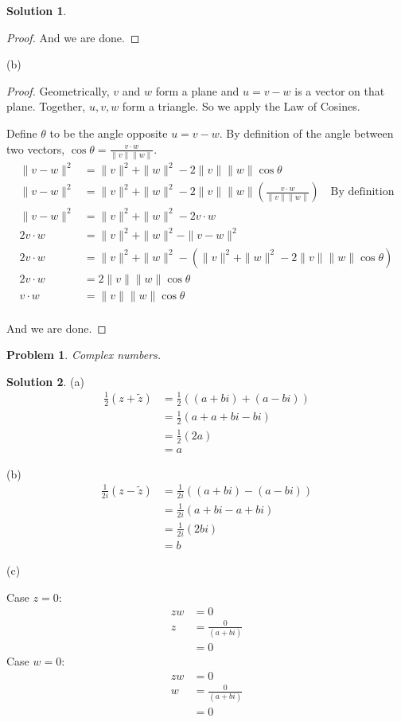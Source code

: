 \documentclass{article}
\newtheorem{problem}{Problem}
\theoremstyle{definition}
\newtheorem*{solution}{Solution}
\begin{document}
\begin{solution}
\begin{proof}
And we are done.
\end{proof}

(b) \begin{proof}
Geometrically, $v$ and $w$ form a plane and $u=v-w$ is a vector on that plane.
Together, $u,v,w$ form a triangle.
So we apply the Law of Cosines.

Define $\theta$ to be the angle opposite $u=v-w$.
By definition of the angle between two vectors, $\cos\theta=\frac{v\cdot w}{\|v\|\|w\|}$.
\begin{align*}
\|v-w\|^2&=\|v\|^2+\|w\|^2-2\|v\|\|w\|\cos\theta \\
\|v-w\|^2&=\|v\|^2+\|w\|^2-2\|v\|\|w\|\left(\frac{v\cdot w}{\|v\|\|w\|}\right) \quad \text{By definition} \\
\|v-w\|^2&=\|v\|^2+\|w\|^2-2v\cdot w \\
2v\cdot w&=\|v\|^2+\|w\|^2-\|v-w\|^2 \\
2v\cdot w&=\|v\|^2+\|w\|^2-(\|v\|^2+\|w\|^2-2\|v\|\|w\|\cos\theta) \\
2v\cdot w&=2\|v\|\|w\|\cos\theta \\
v\cdot w&=\|v\|\|w\|\cos\theta \\
\end{align*}

And we are done.
\end{proof}

\end{solution}

\begin{problem} 

Complex numbers.

\end{problem}

\begin{solution}

(a) \begin{align*}
\frac{1}{2}(z+\tilde{z})&=\frac{1}{2}((a+bi)+(a-bi)) \\
&=\frac{1}{2}(a+a+bi-bi) \\
&=\frac{1}{2}(2a) \\
&=a
\end{align*}

(b) \begin{align*}
\frac{1}{2i}(z-\tilde{z})&=\frac{1}{2i}((a+bi)-(a-bi)) \\
&=\frac{1}{2i}(a+bi-a+bi) \\
&=\frac{1}{2i}(2bi) \\
&=b
\end{align*}

(c) 
\begin{multicols}{2}
Case $z=0$: 
\begin{align*}
zw&=0 \\
z&=\frac{0}{(a+bi)} \\
&=0
\end{align*}
Case $w=0$:
\begin{align*}
zw&=0 \\
w&=\frac{0}{(a+bi)} \\
&=0
\end{align*}
\end{multicols}

\end{solution}
\end{document}
